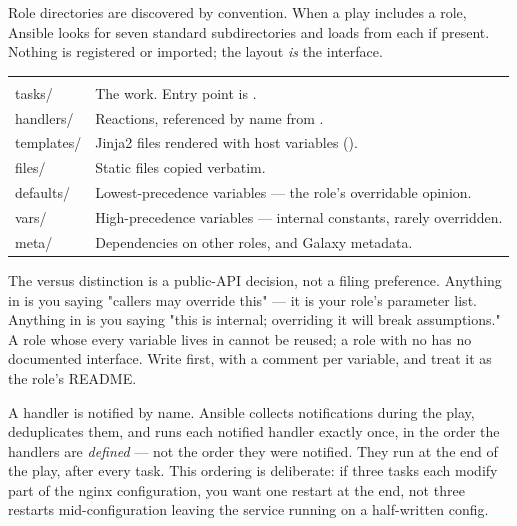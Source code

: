  Role directories are discovered by convention. When a play includes a role, Ansible looks for seven standard subdirectories and loads  from each if present. Nothing is registered or imported; the layout \emph{is} the interface.

\begin{center}\small
\wbrowcolors
\begin{tabularx}{\linewidth}{@{}L{24mm} X@{}}
 & \\
tasks/ & The work. Entry point is .\\
handlers/ & Reactions, referenced by name from .\\
templates/ & Jinja2 files rendered with host variables ().\\
files/ & Static files copied verbatim.\\
defaults/ & Lowest-precedence variables --- the role's overridable opinion.\\
vars/ & High-precedence variables --- internal constants, rarely overridden.\\
meta/ & Dependencies on other roles, and Galaxy metadata.\\
\end{tabularx}
\end{center}

\begin{seniornote}
The  versus  distinction is a public-API decision, not a filing preference. Anything in  is you saying "callers may override this" --- it is your role's parameter list. Anything in  is you saying "this is internal; overriding it will break assumptions." A role whose every variable lives in  cannot be reused; a role with no  has no documented interface. Write  first, with a comment per variable, and treat it as the role's README.
\end{seniornote}

 A handler is notified by name. Ansible collects notifications during the play, deduplicates them, and runs each notified handler exactly once, in the order the handlers are \emph{defined} --- not the order they were notified. They run at the end of the play, after every task. This ordering is deliberate: if three tasks each modify part of the nginx configuration, you want one restart at the end, not three restarts mid-configuration leaving the service running on a half-written config.

